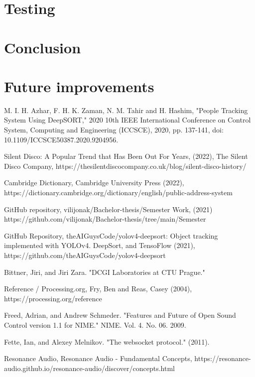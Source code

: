 \documentclass{ctuthesis}
\begin{document}
\chapter{Testing}

\chapter{Conclusion}

\chapter{Future improvements}

\begin{thebibliography}{1}

  M. I. H. Azhar, F. H. K. Zaman, N. M. Tahir and H. Hashim, "People Tracking System Using DeepSORT," 2020 10th IEEE International Conference on Control System, Computing and Engineering (ICCSCE), 2020, pp. 137-141, doi: 10.1109/ICCSCE50387.2020.9204956.

  Silent Disco: A Popular Trend that Has Been Out For Years, (2022), The Silent Disco Company, https://thesilentdiscocompany.co.uk/blog/silent-disco-history/
 
  Cambridge Dictionary, Cambridge University Press (2022), https://dictionary.cambridge.org/dictionary/english/public-address-system
 
  GitHub repository, vilijonak/Bachelor-thesis/Semester Work, (2021) https://github.com/vilijonak/Bachelor-thesis/tree/main/Semester%
 
  GitHub Repository, theAIGuysCode/yolov4-deepsort: Object tracking implemented with YOLOv4. DeepSort, and TensoFlow (2021), https://github.com/theAIGuysCode/yolov4-deepsort

 Bittner, Jiri, and Jiri Zara. "DCGI Laboratories at CTU Prague."

 Reference / Processing.org, Fry, Ben and Reas, Casey (2004), https://processing.org/reference 

 Freed, Adrian, and Andrew Schmeder. "Features and Future of Open Sound Control version 1.1 for NIME." NIME. Vol. 4. No. 06. 2009.

 Fette, Ian, and Alexey Melnikov. "The websocket protocol." (2011).

 Resonance Audio, Resonance Audio - Fundamental Concepts, https://resonance-audio.github.io/resonance-audio/discover/concepts.html


\end{thebibliography}
\end{document}
